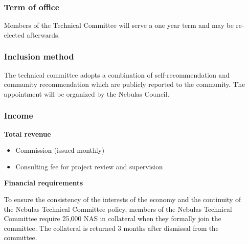 \subsubsection{Term of office}

Members of the Technical Committee will serve a one year term and may be re-elected afterwards.

\subsubsection{Inclusion method}

The technical committee adopts a combination of self-recommendation and community recommendation which are publicly reported to the community. The appointment will be organized by the Nebulas Council.


\subsubsection{Income}

\textbf{Total revenue}

\begin{itemize}
	\item Commission (issued monthly)
	\item Consulting fee for project review and supervision
\end{itemize}

\vspace{2em}

\textbf{Financial requirements}

To ensure the consistency of the interests of the economy and the continuity of the Nebulas Technical Committee policy, members of the Nebulas Technical Committee require 25,000 NAS in collateral when they formally join the committee. The collateral is returned 3 months after dismissal from the committee.